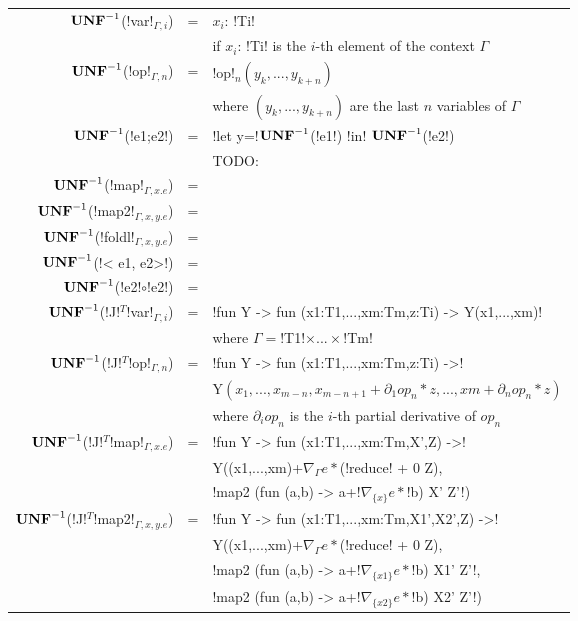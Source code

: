 \begin{figure*}[t]
    \begin{tabular}{r c l}
    $\mathbf{UNF}^{-1}$(!var!$_{\Gamma,i}$) &=& $x_i$: !Ti! \\
    && if $x_i$: !Ti! is the $i$-th element of the context $\Gamma$ \\
    $\mathbf{UNF}^{-1}$(!op!$_{\Gamma,n}$) &=& !op!$_n(y_k,...,y_{k+n})$ \\
    && where $(y_k,...,y_{k+n})$ are the last $n$ variables of $\Gamma$ \\ 
    $\mathbf{UNF}^{-1}$(!e1;e2!) &=& !let y=!$\mathbf{UNF}^{-1}$(!e1!) !in! $\mathbf{UNF}^{-1}$(!e2!) \\ 
    && TODO: \\ 
    $\mathbf{UNF}^{-1}$(!map!$_{\Gamma,x.e}$) &=&  \\ 
    $\mathbf{UNF}^{-1}$(!map2!$_{\Gamma,x,y.e}$) &=&  \\ 
    $\mathbf{UNF}^{-1}$(!foldl!$_{\Gamma,x,y.e}$) &=&  \\ 
    $\mathbf{UNF}^{-1}$(!< e1, e2>!) &=&  \\ 
    $\mathbf{UNF}^{-1}$(!e2!$\circ$!e2!) &=& \\
    $\mathbf{UNF}^{-1}$(!J!$^T$!var!$_{\Gamma,i}$) &=& !fun Y -> fun (x1:T1,...,xm:Tm,z:Ti) -> Y(x1,...,xm)! \\
    &&where $\Gamma=$!T1!$\times...\times$!Tm! \\
    $\mathbf{UNF}^{-1}$(!J!$^T$!op!$_{\Gamma,n}$) &=& !fun Y -> fun (x1:T1,...,xm:Tm,z:Ti) ->!\\ 
    && Y$(x_1,...,x_{m-n},x_{m-n+1}+\partial_1op_n*z,...,xm+\partial_nop_n*z)$ \\
    && where $\partial_iop_n$ is the $i$-th partial derivative of $op_n$ \\
    $\mathbf{UNF}^{-1}$(!J!$^T$!map!$_{\Gamma,x.e}$) &=&  !fun Y -> fun (x1:T1,...,xm:Tm,X',Z) ->!\\
    && Y((x1,...,xm)+$\nabla_{\Gamma}e *$(!reduce! + 0 Z),\\
    && !map2 (fun (a,b) -> a+!$\nabla_{\{x\}}e *$!b) X' Z'!) \\
    $\mathbf{UNF}^{-1}$(!J!$^T$!map2!$_{\Gamma,x,y.e}$) &=&  !fun Y -> fun (x1:T1,...,xm:Tm,X1',X2',Z) ->!\\
    && Y((x1,...,xm)+$\nabla_{\Gamma}e *$(!reduce! + 0 Z),\\
    && !map2 (fun (a,b) -> a+!$\nabla_{\{x1\}}e *$!b) X1' Z'!, \\
    && !map2 (fun (a,b) -> a+!$\nabla_{\{x2\}}e *$!b) X2' Z'!) \\

\end{tabular}
\end{figure*}

